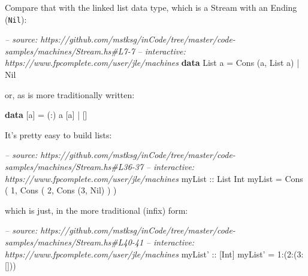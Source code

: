 \documentclass[]{article}
\newenvironment{Shaded}{}{}
\newcommand{\KeywordTok}[1]{\textcolor[rgb]{0.00,0.44,0.13}{\textbf{{#1}}}}
\newcommand{\DataTypeTok}[1]{\textcolor[rgb]{0.56,0.13,0.00}{{#1}}}
\newcommand{\DecValTok}[1]{\textcolor[rgb]{0.25,0.63,0.44}{{#1}}}
\newcommand{\CommentTok}[1]{\textcolor[rgb]{0.38,0.63,0.69}{\textit{{#1}}}}
\newcommand{\OtherTok}[1]{\textcolor[rgb]{0.00,0.44,0.13}{{#1}}}
\newcommand{\FunctionTok}[1]{\textcolor[rgb]{0.02,0.16,0.49}{{#1}}}
\newcommand{\NormalTok}[1]{{#1}}
\begin{document}
Compare that with the linked list data type, which is a Stream with an
Ending (\texttt{Nil}):

\begin{Shaded}
\begin{Highlighting}[]
\CommentTok{-- source: https://github.com/mstksg/inCode/tree/master/code-samples/machines/Stream.hs#L7-7}
\CommentTok{-- interactive: https://www.fpcomplete.com/user/jle/machines}
\KeywordTok{data} \DataTypeTok{List} \NormalTok{a }\FunctionTok{=} \DataTypeTok{Cons} \NormalTok{(a, }\DataTypeTok{List} \NormalTok{a) }\FunctionTok{|} \DataTypeTok{Nil}
\end{Highlighting}
\end{Shaded}

or, as is more traditionally written:

\begin{Shaded}
\begin{Highlighting}[]
\KeywordTok{data} \NormalTok{[a] }\FunctionTok{=} \NormalTok{(}\FunctionTok{:}\NormalTok{) a [a] }\FunctionTok{|} \NormalTok{[]}
\end{Highlighting}
\end{Shaded}

It's pretty easy to build lists:

\begin{Shaded}
\begin{Highlighting}[]
\CommentTok{-- source: https://github.com/mstksg/inCode/tree/master/code-samples/machines/Stream.hs#L36-37}
\CommentTok{-- interactive: https://www.fpcomplete.com/user/jle/machines}
\OtherTok{myList ::} \DataTypeTok{List} \DataTypeTok{Int}
\NormalTok{myList }\FunctionTok{=} \DataTypeTok{Cons} \NormalTok{( }\DecValTok{1}\NormalTok{, }\DataTypeTok{Cons} \NormalTok{( }\DecValTok{2}\NormalTok{, }\DataTypeTok{Cons} \NormalTok{(}\DecValTok{3}\NormalTok{, }\DataTypeTok{Nil}\NormalTok{) ) )}
\end{Highlighting}
\end{Shaded}

which is just, in the more traditional (infix) form:

\begin{Shaded}
\begin{Highlighting}[]
\CommentTok{-- source: https://github.com/mstksg/inCode/tree/master/code-samples/machines/Stream.hs#L40-41}
\CommentTok{-- interactive: https://www.fpcomplete.com/user/jle/machines}
\OtherTok{myList' ::} \NormalTok{[}\DataTypeTok{Int}\NormalTok{]}
\NormalTok{myList' }\FunctionTok{=} \DecValTok{1}\FunctionTok{:}\NormalTok{(}\DecValTok{2}\FunctionTok{:}\NormalTok{(}\DecValTok{3}\FunctionTok{:}\NormalTok{[]))}
\end{Highlighting}
\end{Shaded}
\end{document}
